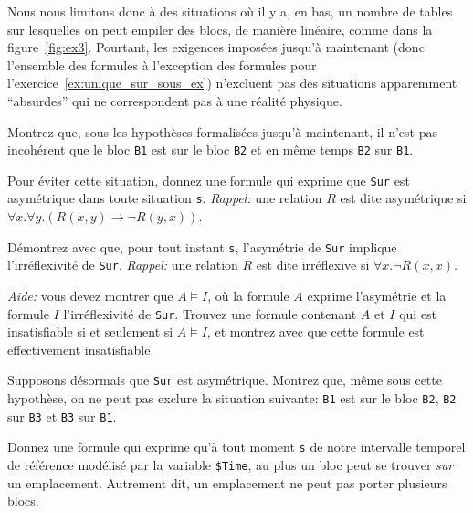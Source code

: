 Nous nous limitons donc à des situations où il y a, en bas, un nombre de
tables sur lesquelles on peut empiler des blocs, de manière linéaire, comme
dans la figure~\ref{fig:ex3}.
Pourtant, les exigences imposées jusqu'à maintenant (donc l'ensemble des
formules à l'exception des formules pour
l'exercice~\ref{ex:unique_sur_sous_ex}) n'excluent pas des situations
apparemment ``absurdes'' qui ne correspondent pas à une réalité physique.


\begin{exo}\label{ex:sur_asym_satisfiable}
Montrez que, sous les hypothèses formalisées jusqu'à maintenant, il n'est
  pas incohérent que le bloc \texttt{B1} est sur le bloc \texttt{B2} et en même temps
  \texttt{B2} sur \texttt{B1}.
  \end{exo}

  \begin{exo}\label{ex:sur_asym}
  Pour éviter cette situation, donnez une formule qui exprime que \texttt{Sur}
  est asymétrique dans toute situation \texttt{s}. \emph{Rappel:} une relation $R$ est dite
  asymétrique si $\forall x. \forall y. (R(x,y) \to  \lnot R(y,x))$.
\end{exo}

\begin{exo}\label{ex:sur_irrefl}
  Démontrez avec \textsc{\touist} que, pour tout instant \texttt{s}, l'asymétrie
  de \texttt{Sur} implique l'irréflexivité de \texttt{Sur}. \emph{Rappel:} une
  relation $R$ est dite irréflexive si $\forall x. \lnot R(x,x)$.

  \emph{Aide:} vous devez montrer que $A \models I$, où la formule $A$ exprime
  l'asymétrie et la formule $I$ l'irréflexivité de \texttt{Sur}. Trouvez une
  formule contenant $A$ et $I$ qui est insatisfiable si et seulement si $A
  \models I$, et montrez avec \textsc{\touist} que cette formule est
  effectivement insatisfiable.
\end{exo}



\begin{exo}\label{ex:sur_cycl}
Supposons désormais que \texttt{Sur} est asymétrique. Montrez que, même sous
  cette hypothèse, on ne peut pas exclure la situation suivante: \texttt{B1} est sur
  le bloc \texttt{B2}, \texttt{B2} sur \texttt{B3} et \texttt{B3} sur \texttt{B1}.
  \end{exo}
\begin{exo}\label{ex:unique_sur}
Donnez une formule qui exprime qu'à tout moment  \texttt{s} de notre intervalle
  temporel de référence modélisé par la variable \texttt{\$Time}, au plus un bloc peut se
  trouver \emph{sur} un emplacement. Autrement dit, un emplacement ne peut pas porter
  plusieurs blocs.
\end{exo}


